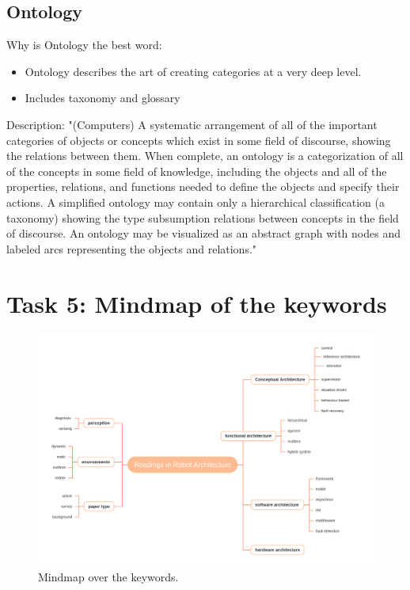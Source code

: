 \documentclass{article}
\begin{document}
  \subsection*{Ontology}
  Why is Ontology the best word:
  \begin{itemize}
      \item Ontology describes the art of creating categories at a very deep level.
      \item Includes taxonomy and glossary
  \end{itemize}

  Description:  "(Computers) A systematic arrangement of all of the important categories of objects or concepts which exist in some field of discourse, showing the relations between them. When complete, an ontology is a categorization of all of the concepts in some field of knowledge, including the objects and all of the properties, relations, and functions needed to define the objects and specify their actions. A simplified ontology may contain only a hierarchical classification (a taxonomy) showing the type subsumption relations between concepts in the field of discourse. An ontology may be visualized as an abstract graph with nodes and labeled arcs representing the objects and relations."\cite{gnu_onto:1}

  \section*{Task 5: Mindmap of the keywords}

  \begin{figure}[h!]
    \includegraphics[width=\linewidth]{readings_mm.png}
    \caption{Mindmap over the keywords.}
    \label{fig:nuns}
  \end{figure}

  \break


\end{document}
